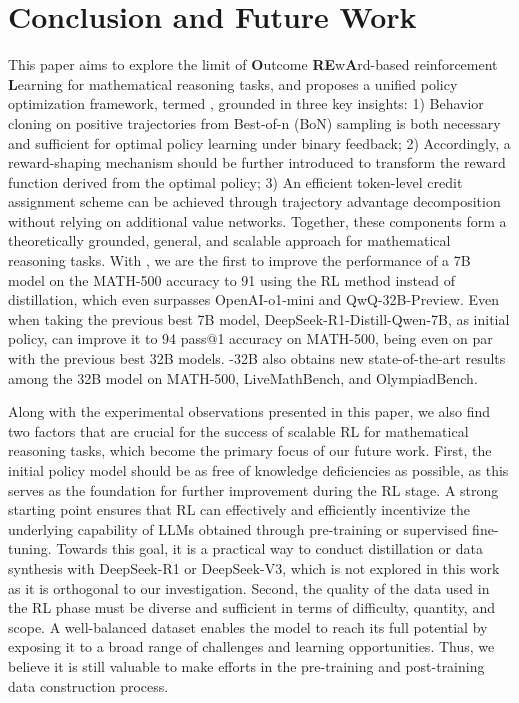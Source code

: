
\section{Conclusion and Future Work}

This paper aims to explore the limit of \textbf{O}utcome \textbf{RE}w\textbf{A}rd-based reinforcement \textbf{L}earning for mathematical reasoning tasks, and proposes a unified policy optimization framework, termed \methodname{}, grounded in three key insights: 1) Behavior cloning on positive trajectories from Best-of-n (BoN) sampling is both necessary and sufficient for optimal policy learning under binary feedback;
2) Accordingly, a reward-shaping mechanism should be further introduced to transform the reward function derived from the optimal policy;
3) An efficient token-level credit assignment scheme can be achieved through trajectory advantage decomposition without relying on additional value networks.
Together, these components form a theoretically grounded, general, and scalable approach for mathematical reasoning tasks.
With \methodname{}, we are the first to improve the performance of a 7B model on the MATH-500 accuracy to 91 using the RL method instead of distillation, which even surpasses OpenAI-o1-mini and QwQ-32B-Preview. Even when taking the previous best 7B model, DeepSeek-R1-Distill-Qwen-7B, as initial policy, \methodname{} can improve it to 94 pass@1 accuracy on MATH-500, being even on par with the previous best 32B models.
\methodname{}-32B also obtains new state-of-the-art results among the 32B model on MATH-500, LiveMathBench, and OlympiadBench.

Along with the experimental observations presented in this paper, we also find two factors that are crucial for the success of scalable RL for mathematical reasoning tasks, which become the primary focus of our future work.
First, the initial policy model should be as free of knowledge deficiencies as possible, as this serves as the foundation for further improvement during the RL stage. A strong starting point ensures that RL can effectively and efficiently incentivize the underlying capability of LLMs obtained through pre-training or supervised fine-tuning. Towards this goal, it is a practical way to conduct distillation or data synthesis with DeepSeek-R1 or DeepSeek-V3, which is not explored in this work as it is orthogonal to our investigation.
Second, the quality of the data used in the RL phase must be diverse and sufficient in terms of difficulty, quantity, and scope. A well-balanced dataset enables the model to reach its full potential by exposing it to a broad range of challenges and learning opportunities. Thus, we believe it is still valuable to make efforts in the pre-training and post-training data construction process.
